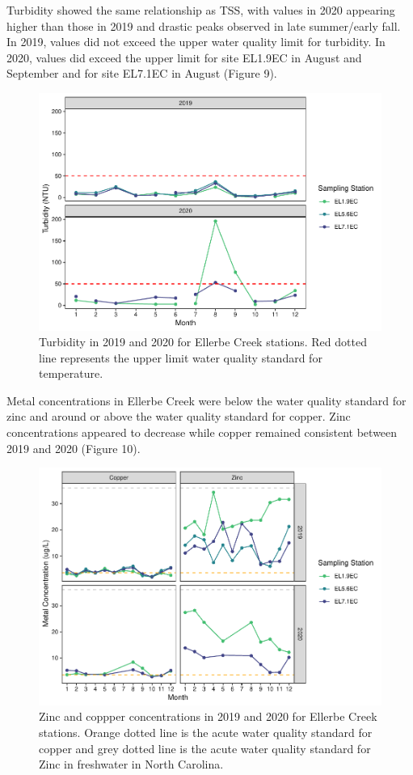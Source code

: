 \documentclass[
  12pt,
]{article}
\begin{document}
Turbidity showed the same relationship as TSS, with values in 2020
appearing higher than those in 2019 and drastic peaks observed in late
summer/early fall. In 2019, values did not exceed the upper water
quality limit for turbidity. In 2020, values did exceed the upper limit
for site EL1.9EC in August and September and for site EL7.1EC in August
(Figure 9).

\begin{figure}
\centering
\includegraphics{August_Lindborg_ENV872_Project_files/figure-latex/unnamed-chunk-21-1.pdf}
\caption{Turbidity in 2019 and 2020 for Ellerbe Creek stations. Red
dotted line represents the upper limit water quality standard for
temperature.}
\end{figure}

Metal concentrations in Ellerbe Creek were below the water quality
standard for zinc and around or above the water quality standard for
copper. Zinc concentrations appeared to decrease while copper remained
consistent between 2019 and 2020 (Figure 10).

\begin{figure}
\centering
\includegraphics{August_Lindborg_ENV872_Project_files/figure-latex/unnamed-chunk-22-1.pdf}
\caption{Zinc and coppper concentrations in 2019 and 2020 for Ellerbe
Creek stations. Orange dotted line is the acute water quality standard
for copper and grey dotted line is the acute water quality standard for
Zinc in freshwater in North Carolina.}
\end{figure}
\end{document}
